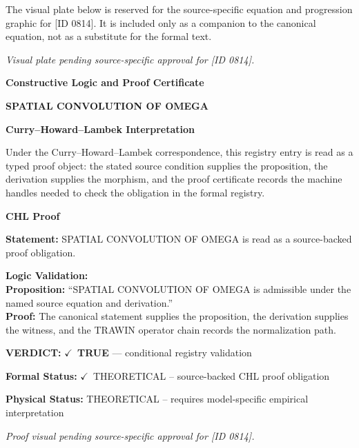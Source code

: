 \begingroup\footnotesize\sloppy
The visual plate below is reserved for the source-specific equation and progression graphic for [ID 0814]. It is included only as a companion to the canonical equation, not as a substitute for the formal text.
\par\endgroup
\begingroup\footnotesize\itshape
Visual plate pending source-specific approval for [ID 0814].
\par\endgroup

\clearpage
\begingroup\tzpsupportsetup
\noindent\textbf{\fontsize{10.8pt}{12.8pt}\selectfont [ID 0814] Constructive Logic and Proof Certificate}\par
\noindent\textbf{\fontsize{10pt}{12pt}\selectfont SPATIAL CONVOLUTION OF OMEGA}\par
\vspace{0.45em}
\begingroup
\footnotesize
\setlength{\parskip}{0.22em}
\setlength{\parindent}{0pt}
\noindent\textbf{Curry--Howard--Lambek Interpretation}\par
Under the Curry--Howard--Lambek correspondence, this registry entry is read as a typed proof
object: the stated source condition supplies the proposition, the derivation supplies the
morphism, and the proof certificate records the machine handles needed to check the obligation
in the formal registry.

\vspace{0.45em}
\noindent\textbf{CHL Proof}\par
\textbf{Statement:} SPATIAL CONVOLUTION OF OMEGA is read as a source-backed proof obligation.

\textbf{Logic Validation:}\\
\textbf{Proposition:} ``SPATIAL CONVOLUTION OF OMEGA is admissible under the named source equation and derivation.''\\
\textbf{Proof:} The canonical statement supplies the proposition, the derivation supplies the witness, and the TRAWIN operator chain records the normalization path.

\textbf{VERDICT:} \ensuremath{\checkmark}\ \textbf{TRUE} --- conditional registry validation

\textbf{Formal Status:} \ensuremath{\checkmark}\ THEORETICAL -- source-backed CHL proof obligation

\textbf{Physical Status:} THEORETICAL -- requires model-specific empirical interpretation
\par\vspace{0.45em}
\par
\vfill
\begingroup\footnotesize\itshape
Proof visual pending source-specific approval for [ID 0814].
\par\endgroup
\vfill
\endgroup
\endgroup
